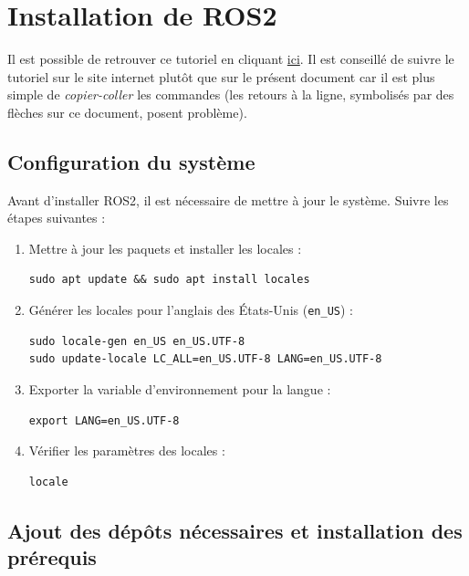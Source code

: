 \chapter{Installation de ROS2}

\noindent Il est possible de retrouver ce tutoriel en cliquant \href{https://docs.ros.org/en/humble/Installation.html}{ici}. Il est conseillé de suivre le tutoriel sur le site internet plutôt que sur le présent document car il est plus simple de \textit{copier-coller} les commandes (les retours à la ligne, symbolisés par des flèches sur ce document, posent problème).

\section{Configuration du système}

Avant d'installer ROS2, il est nécessaire de mettre à jour le système. Suivre les étapes suivantes :

\begin{enumerate}
\item Mettre à jour les paquets et installer les locales :
\begin{lstlisting}[style=commandstyle]
sudo apt update && sudo apt install locales
\end{lstlisting}

\item Générer les locales pour l'anglais des États-Unis (\texttt{en\_US}) :
\begin{lstlisting}[style=commandstyle]
sudo locale-gen en_US en_US.UTF-8
sudo update-locale LC_ALL=en_US.UTF-8 LANG=en_US.UTF-8
\end{lstlisting}

\item Exporter la variable d'environnement pour la langue :
\begin{lstlisting}[style=commandstyle]
export LANG=en_US.UTF-8
\end{lstlisting}

\item Vérifier les paramètres des locales :
\begin{lstlisting}[style=commandstyle]
locale
\end{lstlisting}
\end{enumerate}

\section{Ajout des dépôts nécessaires et installation des prérequis}

